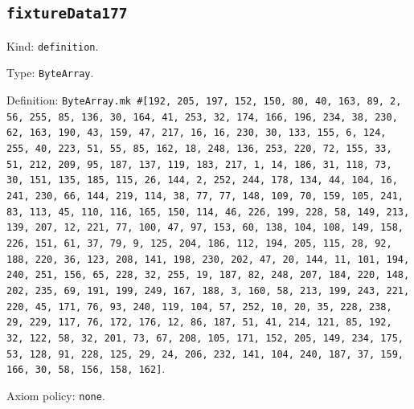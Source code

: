 \documentclass[11pt]{article}
\begin{document}
\subsection*{\texttt{fixtureData177}}
\noindent Kind: \texttt{definition}.\par
\noindent Type: \texttt{ByteArray}.\par
\noindent Definition: \texttt{ByteArray.mk \#[192, 205, 197, 152, 150, 80, 40, 163, 89, 2, 56, 255, 85, 136, 30, 164, 41, 253, 32, 174, 166, 196, 234, 38, 230, 62, 163, 190, 43, 159, 47, 217, 16, 16, 230, 30, 133, 155, 6, 124, 255, 40, 223, 51, 55, 85, 162, 18, 248, 136, 253, 220, 72, 155, 33, 51, 212, 209, 95, 187, 137, 119, 183, 217, 1, 14, 186, 31, 118, 73, 30, 151, 135, 185, 115, 26, 144, 2, 252, 244, 178, 134, 44, 104, 16, 241, 230, 66, 144, 219, 114, 38, 77, 77, 148, 109, 70, 159, 105, 241, 83, 113, 45, 110, 116, 165, 150, 114, 46, 226, 199, 228, 58, 149, 213, 139, 207, 12, 221, 77, 100, 47, 97, 153, 60, 138, 104, 108, 149, 158, 226, 151, 61, 37, 79, 9, 125, 204, 186, 112, 194, 205, 115, 28, 92, 188, 220, 36, 123, 208, 141, 198, 230, 202, 47, 20, 144, 11, 101, 194, 240, 251, 156, 65, 228, 32, 255, 19, 187, 82, 248, 207, 184, 220, 148, 202, 235, 69, 191, 199, 249, 167, 188, 3, 160, 58, 213, 199, 243, 221, 220, 45, 171, 76, 93, 240, 119, 104, 57, 252, 10, 20, 35, 228, 238, 29, 229, 117, 76, 172, 176, 12, 86, 187, 51, 41, 214, 121, 85, 192, 32, 122, 58, 32, 201, 73, 67, 208, 105, 171, 152, 205, 149, 234, 175, 53, 128, 91, 228, 125, 29, 24, 206, 232, 141, 104, 240, 187, 37, 159, 166, 30, 58, 156, 158, 162]}.\par
\noindent Axiom policy: \texttt{none}.\par
\end{document}
